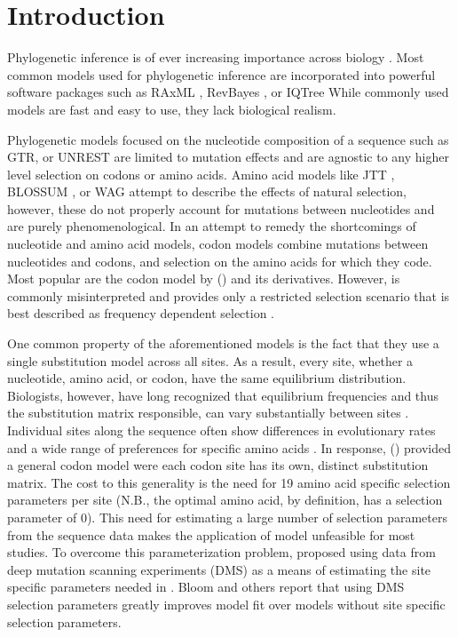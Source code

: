 \newpage


\section{Introduction}
Phylogenetic inference is of ever increasing importance across biology \citep{omeara2006,YangAndBourne2009,Ruprecht2017,SchwartzAndSchaffer2017}. 
Most common models used for phylogenetic inference are incorporated into powerful software packages such as RAxML \citep{raxml}, RevBayes \citep{revbayes}, or IQTree \citep{nguyen2015}
While commonly used models are fast and easy to use, they lack biological realism.

Phylogenetic models focused on the nucleotide composition of a sequence such as GTR, or UNREST \citep{Tavare1986,Yang1994} are limited to mutation effects and are agnostic to any higher level selection on codons or amino acids.
Amino acid models like JTT \citep{jones1992}, BLOSSUM \citep{blossum}, or WAG \citep{whelan2001} attempt to describe the effects of natural selection, however, these do not properly account for mutations between nucleotides and are purely phenomenological.
In an attempt to remedy the shortcomings of nucleotide and amino acid models, codon models combine mutations between nucleotides and codons, and selection on the amino acids for which they code.
Most popular are the codon model by \citet{GoldmanAndYang1994} (\gy) and its derivatives.
However, \gy is commonly misinterpreted and provides only a restricted selection scenario that is best described as frequency dependent selection \citep{HughesAndNei1988,Nowak2006,Hughes2007,beaulieu2019}.

One common property of the aforementioned models is the fact that they use a single substitution model across all sites. 
As a result, every site, whether a nucleotide,  amino acid, or codon, have the same equilibrium distribution.
Biologists, however, have long recognized that equilibrium frequencies and thus the substitution matrix responsible, can vary substantially between sites \citep{felsenstein1981, gojobori1983}.
Individual sites along the sequence often show differences in evolutionary rates and a wide range of preferences for specific amino acids \citep{ashenberg2013, echave2016}.
In response, \citet{HalpernAndBruno1998} (\hb) provided a general codon model were each codon site has its own, distinct substitution matrix.
The cost to this generality is the need for 19 amino acid specific selection parameters per site (N.B., the optimal amino acid, by definition, has a selection parameter of 0).
This need for estimating a large number of selection parameters from the sequence data makes the application of \citet{HalpernAndBruno1998} model unfeasible for most studies.
To overcome this parameterization problem,\citet{bloom2014} proposed using data from deep mutation scanning experiments (DMS) as a means of estimating the site specific parameters needed in \hb.
Bloom and others \citep{bloom2014, bloom2017, hilton2017} report that using DMS selection parameters greatly improves model fit over models without site specific selection parameters.

